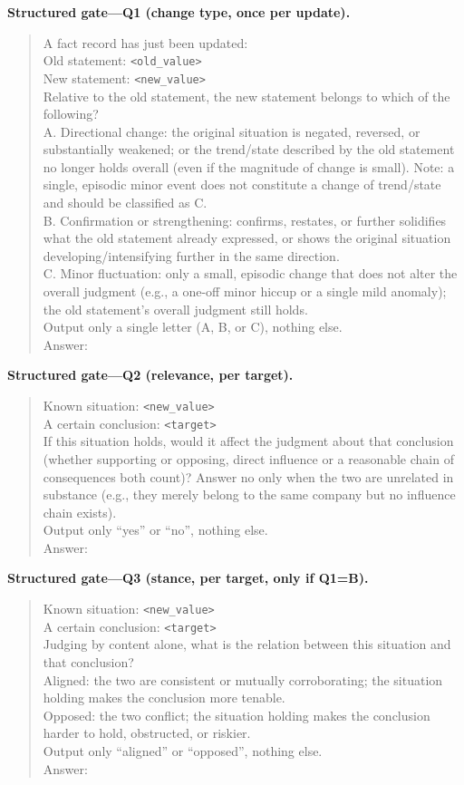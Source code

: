 \documentclass{article}
\theoremstyle{definition}
\begin{document}
\textbf{Structured gate---Q1 (change type, once per update).}
\begin{quote}\small
A fact record has just been updated:\\
Old statement: \texttt{<old\_value>}\\
New statement: \texttt{<new\_value>}\\[2pt]
Relative to the old statement, the new statement belongs to which of
the following?\\
A. Directional change: the original situation is negated, reversed,
or substantially weakened; or the trend/state described by the old
statement no longer holds overall (even if the magnitude of change is
small).  Note: a single, episodic minor event does not constitute a
change of trend/state and should be classified as C.\\
B. Confirmation or strengthening: confirms, restates, or further
solidifies what the old statement already expressed, or shows the
original situation developing/intensifying further in the same
direction.\\
C. Minor fluctuation: only a small, episodic change that does not
alter the overall judgment (e.g., a one-off minor hiccup or a single
mild anomaly); the old statement's overall judgment still holds.\\[2pt]
Output only a single letter (A, B, or C), nothing else.\\
Answer:
\end{quote}

\textbf{Structured gate---Q2 (relevance, per target).}
\begin{quote}\small
Known situation: \texttt{<new\_value>}\\
A certain conclusion: \texttt{<target>}\\[2pt]
If this situation holds, would it affect the judgment about that
conclusion (whether supporting or opposing, direct influence or a
reasonable chain of consequences both count)?  Answer no only when
the two are unrelated in substance (e.g., they merely belong to the
same company but no influence chain exists).\\[2pt]
Output only ``yes'' or ``no'', nothing else.\\
Answer:
\end{quote}

\textbf{Structured gate---Q3 (stance, per target, only if Q1=B).}
\begin{quote}\small
Known situation: \texttt{<new\_value>}\\
A certain conclusion: \texttt{<target>}\\[2pt]
Judging by content alone, what is the relation between this situation
and that conclusion?\\
Aligned: the two are consistent or mutually corroborating; the
situation holding makes the conclusion more tenable.\\
Opposed: the two conflict; the situation holding makes the conclusion
harder to hold, obstructed, or riskier.\\[2pt]
Output only ``aligned'' or ``opposed'', nothing else.\\
Answer:
\end{quote}
\end{document}
